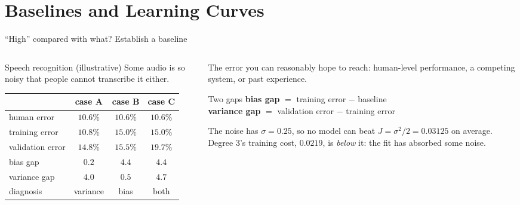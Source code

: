 \documentclass[aspectratio=169,10pt]{beamer}
\begin{document}
\section{Baselines and Learning Curves}

\begin{frame}{``High'' compared with what? Establish a baseline}
  \begin{columns}[T,onlytextwidth]
    \begin{column}{0.5\textwidth}
      \footnotesize
      \begin{block}{Speech recognition (illustrative)}
        Some audio is so noisy that people cannot transcribe it either.\par
        \vspace{1mm}
        \renewcommand{\arraystretch}{1.15}
        \begin{tabular}{@{}lccc@{}}
          \toprule
          & case A & case B & case C\\
          \midrule
          human error     & $10.6\%$ & $10.6\%$ & $10.6\%$\\
          training error  & $10.8\%$ & $15.0\%$ & $15.0\%$\\
          validation error & $14.8\%$ & $15.5\%$ & $19.7\%$\\
          \midrule
          bias gap       & $0.2$ & $4.4$ & $4.4$\\
          variance gap   & $4.0$ & $0.5$ & $4.7$\\
          \midrule
          diagnosis & variance & bias & both\\
          \bottomrule
        \end{tabular}
      \end{block}
    \end{column}
    \begin{column}{0.46\textwidth}
      \footnotesize
      \begin{defnbox}
        \small The error you can reasonably hope to reach: human-level performance, a
        competing system, or past experience.
      \end{defnbox}
      \begin{block}{Two gaps}
        \textbf{bias gap} $=$ training error $-$ baseline\\
        \textbf{variance gap} $=$ validation error $-$ training error
      \end{block}
      \begin{keyidea}
        The noise has $\sigma=0.25$, so no model can beat
        $J=\sigma^2/2=0.03125$ on average. Degree 3's training cost, $0.0219$, is
        \emph{below} it: the fit has absorbed some noise.
      \end{keyidea}
    \end{column}
  \end{columns}
\end{frame}
\end{document}
